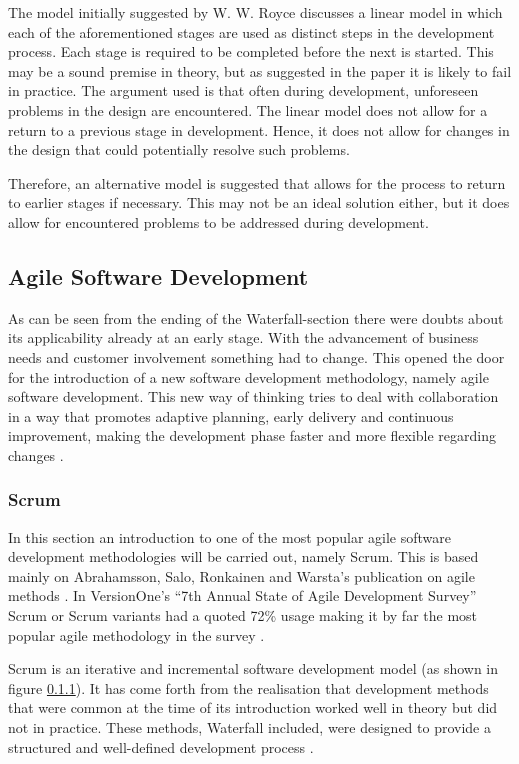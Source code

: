 The model initially suggested by W. W. Royce discusses a linear model in which each of the aforementioned stages are used as distinct steps in the development process. Each stage is required to be completed before the next is started. This may be a sound premise in theory, but as suggested in the paper it is likely to fail in practice. The argument used is that often during development, unforeseen problems in the design are encountered. The linear model does not allow for a return to a previous stage in development. Hence, it does not allow for changes in the design that could potentially resolve such problems.

Therefore, an alternative model is suggested that allows for the process to return to earlier stages if necessary. This may not be an ideal solution either, but it does allow for encountered problems to be addressed during development.

\subsection{Agile Software Development}

As can be seen from the ending of the Waterfall-section there were doubts about its applicability already at an early stage. With the advancement of business needs and customer involvement something had to change. This opened the door for the introduction of a new software development methodology, namely agile software development. This new way of thinking tries to deal with collaboration in a way that promotes adaptive planning, early delivery and continuous improvement, making the development phase faster and more flexible regarding changes \cite{abrahamsson2002}.

\subsubsection{Scrum}
\label{scrum}

In this section an introduction to one of the most popular agile software development methodologies will be carried out, namely Scrum. This is based mainly on Abrahamsson, Salo, Ronkainen and Warsta's publication on agile methods \cite{abrahamsson2002}. In VersionOne's ``7th Annual State of Agile Development Survey'' Scrum or Scrum variants had a quoted 72\% usage making it by far the most popular agile methodology in the survey \cite{Com2013}.

Scrum is an iterative and incremental software development model (as shown in figure \ref{scrum}). It has come forth from the realisation that development methods that were common at the time of its introduction worked well in theory but did not in practice. These methods, Waterfall included, were designed to provide a structured and well-defined development process \cite{scrum}.


